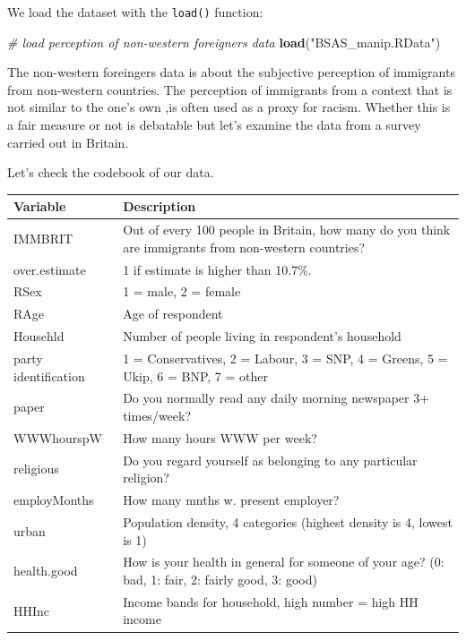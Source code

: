 \documentclass[]{book}
\newenvironment{Shaded}{\begin{snugshade}}{\end{snugshade}}
\newcommand{\KeywordTok}[1]{\textcolor[rgb]{0.13,0.29,0.53}{\textbf{#1}}}
\newcommand{\StringTok}[1]{\textcolor[rgb]{0.31,0.60,0.02}{#1}}
\newcommand{\CommentTok}[1]{\textcolor[rgb]{0.56,0.35,0.01}{\textit{#1}}}
\newcommand{\NormalTok}[1]{#1}
\theoremstyle{definition}
\theoremstyle{definition}
\theoremstyle{definition}
\theoremstyle{remark}
\begin{document}
We load the dataset with the \texttt{load()} function:

\begin{Shaded}
\begin{Highlighting}[]
\CommentTok{# load perception of non-western foreigners data}
\KeywordTok{load}\NormalTok{(}\StringTok{"BSAS_manip.RData"}\NormalTok{)}
\end{Highlighting}
\end{Shaded}

The non-western foreingers data is about the subjective perception of
immigrants from non-western countries. The perception of immigrants from
a context that is not similar to the one's own ,is often used as a proxy
for racism. Whether this is a fair measure or not is debatable but let's
examine the data from a survey carried out in Britain.

Let's check the codebook of our data.

\begin{tabular}{l|l}
\hline
Variable & Description\\
\hline
IMMBRIT & Out of every 100 people in Britain, how many do you think are immigrants from non-western countries?\\
\hline
over.estimate & 1 if estimate is higher than 10.7\%.\\
\hline
RSex & 1 = male, 2 = female\\
\hline
RAge & Age of respondent\\
\hline
Househld & Number of people living in respondent's household\\
\hline
party identification & 1 = Conservatives, 2 = Labour, 3 = SNP, 4 = Greens, 5 = Ukip, 6 = BNP, 7 = other\\
\hline
paper & Do you normally read any daily morning newspaper 3+ times/week?\\
\hline
WWWhourspW & How many hours WWW per week?\\
\hline
religious & Do you regard yourself as belonging to any particular religion?\\
\hline
employMonths & How many mnths w. present employer?\\
\hline
urban & Population density, 4 categories (highest density is 4, lowest is 1)\\
\hline
health.good & How is your health in general for someone of your age? (0: bad, 1: fair, 2: fairly good, 3: good)\\
\hline
HHInc & Income bands for household, high number = high HH income\\
\hline
\end{tabular}
\end{document}

